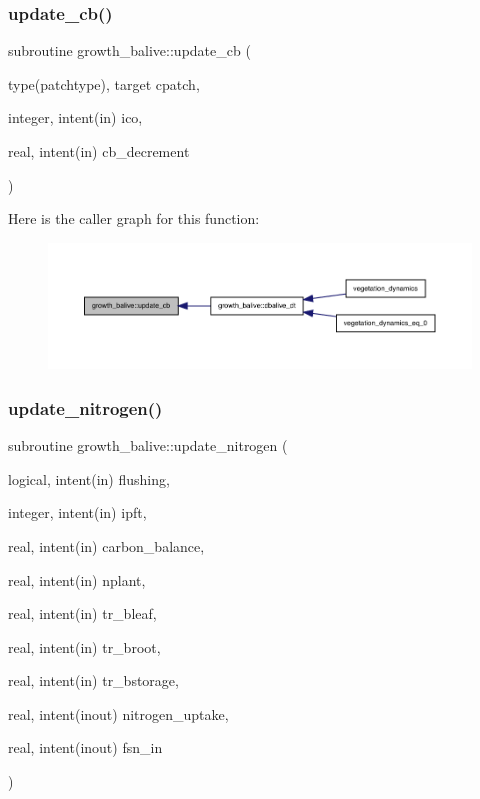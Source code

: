 \subsubsection{\texorpdfstring{update\+\_\+cb()}{update\_cb()}}
{\footnotesize\ttfamily subroutine growth\+\_\+balive\+::update\+\_\+cb (\begin{DoxyParamCaption}\item[{type(patchtype), target}]{cpatch,  }\item[{integer, intent(in)}]{ico,  }\item[{real, intent(in)}]{cb\+\_\+decrement }\end{DoxyParamCaption})}

Here is the caller graph for this function\+:
\nopagebreak
\begin{figure}[H]
\begin{center}
\leavevmode
\includegraphics[width=350pt]{namespacegrowth__balive_ac4ca7901eed6321044f171f6f1b8d7d6_icgraph}
\end{center}
\end{figure}
\mbox{\label{namespacegrowth__balive_a8599682ade194a107377a540d7e64c73}} 
\subsubsection{\texorpdfstring{update\+\_\+nitrogen()}{update\_nitrogen()}}
{\footnotesize\ttfamily subroutine growth\+\_\+balive\+::update\+\_\+nitrogen (\begin{DoxyParamCaption}\item[{logical, intent(in)}]{flushing,  }\item[{integer, intent(in)}]{ipft,  }\item[{real, intent(in)}]{carbon\+\_\+balance,  }\item[{real, intent(in)}]{nplant,  }\item[{real, intent(in)}]{tr\+\_\+bleaf,  }\item[{real, intent(in)}]{tr\+\_\+broot,  }\item[{real, intent(in)}]{tr\+\_\+bstorage,  }\item[{real, intent(inout)}]{nitrogen\+\_\+uptake,  }\item[{real, intent(inout)}]{fsn\+\_\+in }\end{DoxyParamCaption})}

